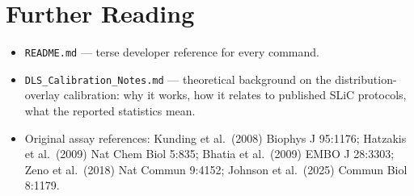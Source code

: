 \documentclass[11pt]{article}
\newcommand{\code}[1]{\texttt{#1}}
\begin{document}
\section{Further Reading}

\begin{itemize}[leftmargin=*]
    \item \code{README.md} --- terse developer reference for every
    command.
    \item \code{DLS\_Calibration\_Notes.md} --- theoretical
    background on the distribution-overlay calibration: why it
    works, how it relates to published SLiC protocols, what the
    reported statistics mean.
    \item Original assay references: Kunding et al.\ (2008) Biophys
    J 95:1176; Hatzakis et al.\ (2009) Nat Chem Biol 5:835; Bhatia
    et al.\ (2009) EMBO J 28:3303; Zeno et al.\ (2018) Nat Commun
    9:4152; Johnson et al.\ (2025) Commun Biol 8:1179.
\end{itemize}
\end{document}
